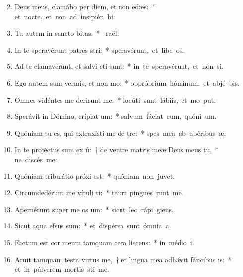 \begin{flushleft}
\begin{enumerate}[leftmargin=*]
\setcounter{enumi}{1}

\item Deus meus, clamábo per diem, et non edies:~* \mbox{et nocte, et non ad insipién hi.}
\item Tu autem in sancto bitas:~* \mbox{ raël.}
\item In te speravérunt patres stri:~* \mbox{speravérunt, et libe os.}
\item Ad te clamavérunt, et salvi cti sunt:~* \mbox{in te speravérunt, et non  si.}
\item Ego autem sum vermis, et non mo:~* \mbox{oppróbrium hóminum, et abjé bis.}
\item Omnes vidéntes me derirunt me:~* \mbox{locúti sunt lábiis, et mo put.}
\item Sperávit in Dómino, erípiat um:~* \mbox{salvum fáciat eum, quóni  um.}
\item Quóniam tu es, qui extraxísti me de tre:~* \mbox{spes mea ab ubéribus  æ.}
\item In te projéctus sum ex ú:~† de ventre matris meæ Deus meus  tu,~* \mbox{ne discés  me:}
\item Quóniam tribulátio próxi est:~* \mbox{quóniam non   juvet.}
\item Circumdedérunt me vítuli ti:~* \mbox{tauri pingues runt me.}
\item Aperuérunt super me os um:~* \mbox{sicut leo rápi  giens.}
\item Sicut aqua efsus sum:~* \mbox{et dispérsa sunt ómnia  a.}
\item Factum est cor meum tamquam cera liscens:~* \mbox{in médio  i.}
\item Aruit tamquam testa virtus me,~† et lingua mea adh\'{\ae}sit fáucibus is:~* \mbox{et in púlverem mortis sti me.}

\end{enumerate}
\end{flushleft}

